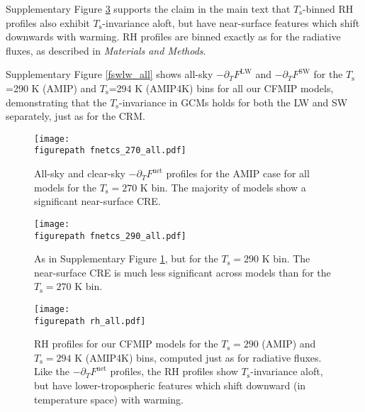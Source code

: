 \documentclass[11pt]{article}
\newcommand{\ppt}{\ensuremath{\partial_T}}
\newcommand{\FLW}{\ensuremath{F^\mathrm{LW}}}
\newcommand{\FSW}{\ensuremath{F^\mathrm{SW}}}
\newcommand{\Fnet}{\ensuremath{F^\mathrm{net}}}
\newcommand{\Ts}{\ensuremath{T_\mathrm{s}}}
\newcommand{\figurepath}{../../figures/}
\begin{document}
Supplementary Figure \ref{rh_all} supports the claim in the main text that \Ts-binned RH profiles also exhibit \Ts-invariance aloft, but have near-surface features which shift downwards with warming. RH profiles are binned exactly as for the radiative fluxes, as described in \emph{Materials and Methods}.
 
 Supplementary Figure \ref{fswlw_all} shows  all-sky $-\ppt \FLW$ and $-\ppt \FSW$ for the \Ts=290 K (AMIP) and \Ts=294 K (AMIP4K) bins for all our CFMIP models, demonstrating that the \Ts-invariance in GCMs holds for both the LW and SW separately, just as for the CRM.
 
\begin{figure}[h]
        \begin{center}
                        \texttt{[image: \\figurepath fnetcs\_270\_all.pdf]}
                \caption{All-sky and clear-sky $-\ppt\Fnet$ profiles for the AMIP case for all models for the $\Ts=270$ K bin. The majority of models show a significant near-surface CRE.
                                \label{fnetcs_270_all}
                }
        \end{center}
\end{figure}

\begin{figure}[h]
        \begin{center}
                        \texttt{[image: \\figurepath fnetcs\_290\_all.pdf]}
                \caption{As in Supplementary Figure \ref{fnetcs_270_all},  but for the $\Ts= 290$ K bin. The near-surface CRE is much less significant across models than for the $\Ts= 270$ K bin.
                                \label{fnetcs_290_all}
                }
        \end{center}
\end{figure}

\begin{figure}[h]
        \begin{center}
                        \texttt{[image: \\figurepath rh\_all.pdf]}
                \caption{RH profiles for our CFMIP models for the $\Ts=290$ (AMIP) and  $\Ts= 294$ K (AMIP4K) bins, computed just as for radiative fluxes. Like the $-\ppt\Fnet$ profiles, the RH profiles show \Ts-invariance aloft, but have lower-tropospheric features which shift downward (in temperature space) with warming.
                                \label{rh_all}
                }
        \end{center}
\end{figure}
\end{document}
